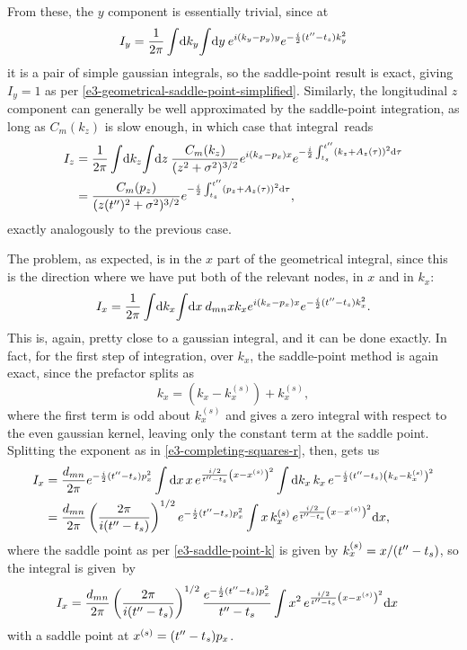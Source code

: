 From these, the $y$ component is essentially trivial, since at
\begin{equation}
I_y
=
\frac{1}{2\pi}
\int \! \mathrm{d} k_y \! \int \! \mathrm{d} y \:
e^{i(k_y-p_y)y}
e^{-\frac{i}{2} (t''-{t_s})k_y^2}
\end{equation}
it is a pair of simple gaussian integrals, so the saddle-point result is exact, giving $I_y=1$ as per \eqref{e3-geometrical-saddle-point-simplified}. Similarly, the longitudinal $z$ component can generally be well approximated by the saddle-point integration, as long as $C_m(k_z)$ is slow enough, in which case that integral~reads
\begin{align}
I_z
& =
\frac{1}{2\pi}
\int \! \mathrm{d} k_z \! \int \! \mathrm{d} z \:
\frac{C_m(k_z)}{(z^2+\sigma^2)^{3/2}}
e^{i(k_x-p_x)x}
e^{-\frac{i}{2} \int_{{t_s}}^{t''}\left(k_z+A_z(\tau)\right)^2\mathrm{d}\tau}
\nonumber \\ & =
\frac{C_m(p_z)}{(z(t'')^2+\sigma^2)^{3/2}}
e^{-\frac{i}{2} \int_{{t_s}}^{t''}\left(p_z+A_z(\tau)\right)^2\mathrm{d}\tau}
,
\end{align}
exactly analogously to the previous case.


The problem, as expected, is in the $x$ part of the geometrical integral, since this is the direction where we have put both of the relevant nodes, in $x$ and in $k_x$:
\begin{equation}
I_x
=
\frac{1}{2\pi}
\int \! \mathrm{d} k_x \! \int \! \mathrm{d} x \:
d_{mn}x k_x
e^{i(k_x-p_x)x}
e^{-\frac{i}{2} (t''-{t_s})k_x^2}
.
\end{equation}
This is, again, pretty close to a gaussian integral, and it can be done exactly. In fact, for the first step of integration, over $k_x$, the saddle-point method is again exact, since the prefactor splits as
\begin{equation}
k_x=(k_x-k_x^{(s)})+k_x^{(s)},
\end{equation}
where the first term is odd about $k_x^{(s)}$ and gives a zero integral with respect to the even gaussian kernel, leaving only the constant term at the saddle point. Splitting the exponent as in \eqref{e3-completing-squares-r}, then, gets us
\begin{align}
I_x
& =
\frac{d_{mn}}{2\pi}
e^{-\frac{i}{2} (t''-{t_s})p_x^2}
\int 
\mathrm{d} x \,
x \,
e^{\frac{i/2}{t''-{t_s}}\left(x-x^{(s)}\right)^2}
\int 
\mathrm{d} k_x \,
k_x\,
e^{-\frac{i}{2} (t''-{t_s})\left(k_x-k_x^{(s)}\right)^2} 
\nonumber \\ & =
\frac{d_{mn}}{2\pi}
\left(
 \frac{2\pi}{i(t''-{t_s})}
 \right)^{1/2}
e^{-\frac{i}{2} (t''-{t_s})p_x^2}
\int 
x \,
k_x^{(s)} \,
e^{\frac{i/2}{t''-{t_s}}\left(x-x^{(s)}\right)^2}
\mathrm{d} x
,
\label{e3-Ix-integral-after-k-integration}
\end{align}
where the saddle point as per \eqref{e3-saddle-point-k} is given by $k_x^{(s)}= x/(t''-{t_s})$, so the integral is given~by
\begin{align}
I_x
& =
\frac{d_{mn}}{2\pi}
\left(
 \frac{2\pi}{i(t''-{t_s})}
 \right)^{1/2}
\frac{
 e^{-\frac{i}{2} (t''-{t_s})p_x^2}
 }{t''-{t_s}}
\int 
x^2 \,
e^{\frac{i/2}{t''-{t_s}}\left(x-x^{(s)}\right)^2}
\mathrm{d} x
\label{e3-Ix-integral-with-x2-node}
\end{align}
with a saddle point at $x^{(s)}=(t''-{t_s})p_x$.

